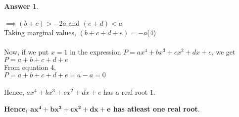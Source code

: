 \documentclass[a4paper]{article}
\theoremstyle{definition}
\newtheorem{answer}{Answer}
\begin{document}
\begin{answer}
\begin{enumerate}
\begin{enumerate}
            $\implies \left(b + c\right) > -2a$ and $\left(e + d\right) < a$\\
            Taking marginal values, $(b + c + d + e) = -a$\space\space\space\space(4)\\\\
            Now, if we put $x = 1$ in the expression $P = ax^4 + bx^3 + cx^2 + dx + e$, we get\\
            $P = a + b + c + d + e$\\
            From equation 4, \\
            $P = a + b + c + d + e = a - a = 0$\\\\
            Hence, $ax^4 + bx^3 + cx^2 + dx + e$ has a real root $1$.
            \end{enumerate}
        \textbf{Hence, $\boldsymbol{ax^4 + bx^3 + cx^2 + dx + e}$ has atleast one real root}. 
    \end{enumerate}
\end{answer}
\vspace*{2em}
\end{document}
